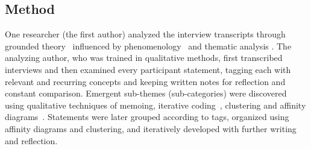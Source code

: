 \subsection{Method}
\label{sec:interviews:designers}
\noindent
One researcher (the 
first author) analyzed the interview transcripts through grounded theory~\citep{Corbin2008} influenced by %
 phenomenology~\citep{Moustakas1994} and thematic analysis \citep{Ryan2003}.
%
The analyzing author, who was trained in qualitative methods, first transcribed interviews and then examined every participant statement, tagging each with relevant and recurring concepts and keeping written notes for reflection and constant comparison.
Emergent sub-themes (sub-categories) \citep{Ryan2003} were discovered using qualitative techniques of memoing, iterative coding~\citep{Corbin2008}, clustering and affinity diagrams~\citep{Moustakas1994}.
Statements were later grouped according to tags, organized using affinity diagrams and clustering, and iteratively developed with further writing and reflection.
